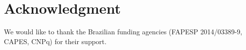 \section{Acknowledgment}\label{section8}

We would like to thank the Brazilian funding agencies (FAPESP 2014/03389-9, CAPES, CNPq) for their support.